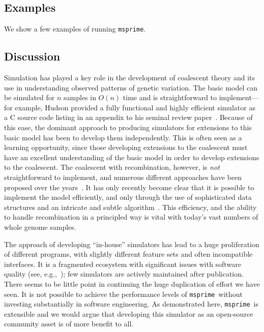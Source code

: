 \documentclass{article}
\newcommand{\msprime}[0]{\texttt{msprime}}
\begin{document}
\subsection*{Examples}
We show a few examples of running \msprime.

\subsection*{Discussion}
Simulation has played a key role in the development of coalescent theory
and its use in understanding observed patterns of genetic variation.
The basic model can be simulated for $n$ samples in $O(n)$ time
and is straightforward to implement---for example, Hudson provided a fully
functional and highly efficient simulator as a C source code listing in an
appendix to his seminal review paper~\citep{hudson1990gene}. Because of
this ease, the dominant approach to producing simulators for extensions
to this basic model has been to develop them independently. This is
often seen as a learning opportunity, since those developing extensions
to the coalescent must have an excellent understanding of the basic
model in order to develop extensions to the coalescent.
The coalescent with recombination, however, is \emph{not} straightforward
to implement, and numerous different approaches have been
proposed over the
years~\citep{hudson1983properties,griffiths1997ancestral,wiuf1999recombination,
mcvean2005approximating}. It has only recently become clear that it is
possible to implement the model efficiently, and only through the use
of sophisticated data structures and an intricate and subtle
algorithm~\citep{kelleher2016efficient}.
This efficiency, and the ability to handle recombination in a principled
way is vital with today's vast numbers of whole genome samples.

The approach of developing ``in-house'' simulators
has lead to a huge proliferation of different programs, with
slightly different feature sets and often incompatible interfaces.
It is a fragmented ecosystem with significant issues with software
quality (see, e.g.,~\cite{yang2014critical});
few simulators are actively maintained after publication.
There seems to be little point
in continuing the huge duplication of effort we have seen.
It is not possible to achieve the performance levels of
\msprime\ without investing substantially in software engineering.
As demonstrated here, \msprime\ is extensible and we would argue
that developing this simulator as an open-source community asset
is of more benefit to all.
\end{document}
